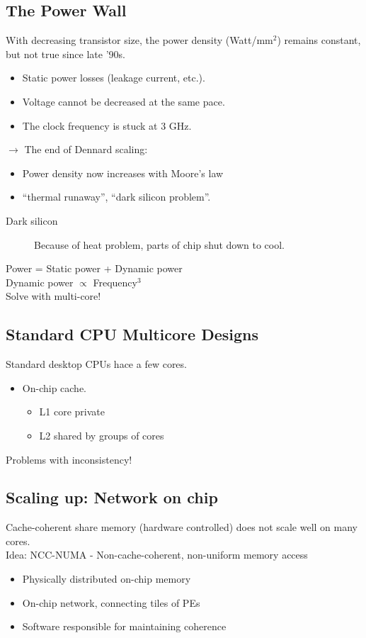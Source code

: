 \documentclass[a4paper]{article}
\begin{document}
\subsection{The Power Wall}
With decreasing transistor size, the power density (Watt/mm$^2$) remains
constant, but not true since late '90s.
\begin{itemize}
  \item Static power losses (leakage current, etc.).
  \item Voltage cannot be decreased at the same pace.
  \item The clock frequency is stuck at 3 GHz.
\end{itemize}

$\rightarrow$ The end of Dennard scaling:
\begin{itemize}
  \item Power density now increases with Moore's law
  \item ``thermal runaway'', ``dark silicon problem''.
\end{itemize}

\begin{description}
  \item[Dark silicon] Because of heat problem, parts of chip shut down to cool.
\end{description}
Power = Static power + Dynamic power\\
Dynamic power $\propto$ Frequency$^3$\\
Solve with multi-core!

\subsection{Standard CPU Multicore Designs}
Standard desktop CPUs hace a few cores.
\begin{itemize}
  \item On-chip cache.
    \begin{itemize}
      \item L1 core private
      \item L2 shared by groups of cores
    \end{itemize}
\end{itemize}
Problems with inconsistency!

\subsection{Scaling up: Network on chip}
Cache-coherent share memory (hardware controlled) does not scale well on many
cores.\\
Idea: NCC-NUMA - Non-cache-coherent, non-uniform memory access
\begin{itemize}
  \item Physically distributed on-chip memory
  \item On-chip network, connecting tiles of PEs
  \item Software responsible for maintaining coherence
\end{itemize}
\end{document}

